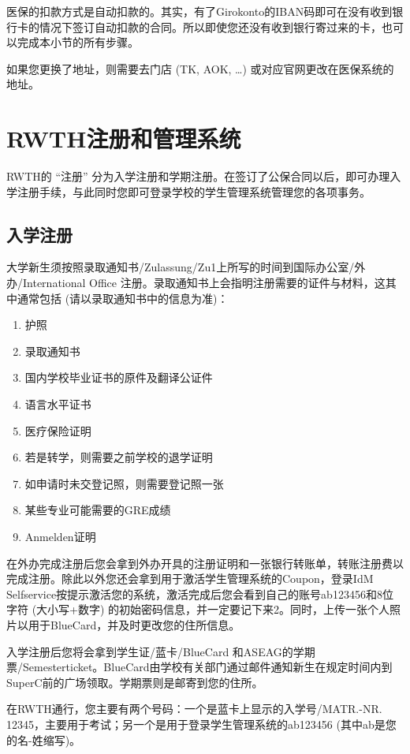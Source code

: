     医保的扣款方式是自动扣款的。其实，有了Girokonto的IBAN码即可在没有收到银行卡的情况下签订自动扣款的合同。所以即使您还没有收到银行寄过来的卡，也可以完成本小节的所有步骤。

    如果您更换了地址，则需要去门店 (TK, AOK, …) 或对应官网更改在医保系统的地址。

\section{RWTH注册和管理系统}

  RWTH的 “注册” 分为入学注册和学期注册。在签订了公保合同以后，即可办理入学注册手续，与此同时您即可登录学校的学生管理系统管理您的各项事务。

  \subsection{入学注册}

    大学新生须按照录取通知书/Zulassung/Zu1上所写的时间到国际办公室/外办/International Office 注册。录取通知书上会指明注册需要的证件与材料，这其中通常包括 (请以录取通知书中的信息为准)：
    \begin{enumerate}
      \item 护照
      \item 录取通知书
      \item 国内学校毕业证书的原件及翻译公证件
      \item 语言水平证书
      \item 医疗保险证明
      \item 若是转学，则需要之前学校的退学证明
      \item 如申请时未交登记照，则需要登记照一张
      \item 某些专业可能需要的GRE成绩
      \item Anmelden证明
    \end{enumerate}
    
    在外办完成注册后您会拿到外办开具的注册证明和一张银行转账单，转账注册费以完成注册。除此以外您还会拿到用于激活学生管理系统的Coupon，登录IdM Selfservice按提示激活您的系统，激活完成后您会看到自己的账号ab123456和8位字符 (大小写+数字) 的初始密码信息，并一定要记下来2。同时，上传一张个人照片以用于BlueCard，并及时更改您的住所信息。

    入学注册后您将会拿到学生证/蓝卡/BlueCard 和ASEAG的学期票/Semesterticket。BlueCard由学校有关部门通过邮件通知新生在规定时间内到SuperC前的广场领取。学期票则是邮寄到您的住所。

    在RWTH通行，您主要有两个号码：一个是蓝卡上显示的入学号/MATR.-NR. 12345，主要用于考试；另一个是用于登录学生管理系统的ab123456 (其中ab是您的名-姓缩写)。

